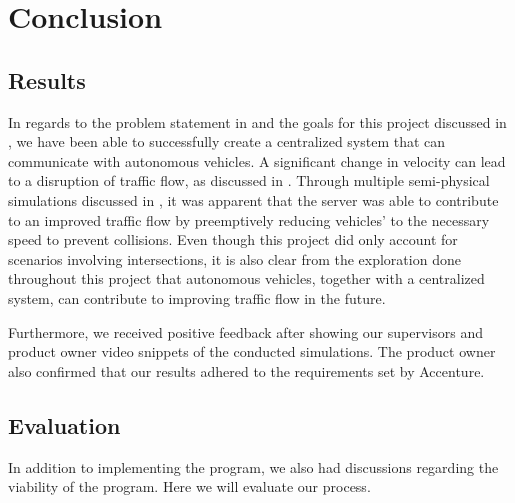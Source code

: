 \chapter{Conclusion}
\section{Results}
In regards to the problem statement in  and the goals for this project discussed in , we have been able to successfully create a centralized system that can communicate with autonomous vehicles. A significant change in velocity can lead to a disruption of traffic flow, as discussed in . Through multiple semi-physical simulations discussed in , it was apparent that the server was able to contribute to an improved traffic flow by preemptively reducing vehicles' to the necessary speed to prevent collisions. Even though this project did only account for scenarios involving intersections, it is also clear from the exploration done throughout this project that autonomous vehicles, together with a centralized system, can contribute to improving traffic flow in the future.

Furthermore, we received positive feedback after showing our supervisors and product owner video snippets of the conducted simulations. The product owner also confirmed that our results adhered to the requirements set by Accenture.

%


\section{Evaluation}
In addition to implementing the program, we also had discussions regarding the viability of the program. Here we will evaluate our process.


